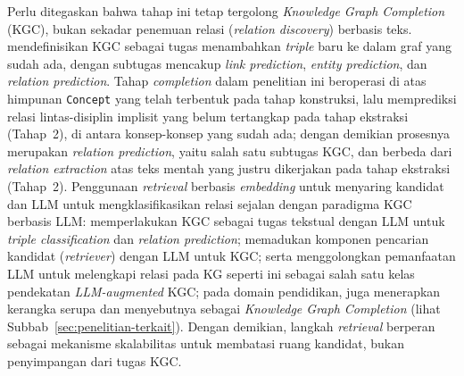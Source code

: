 \documentclass[../../thesis]{subfiles}
\begin{document}
Perlu ditegaskan bahwa tahap ini tetap tergolong \textit{Knowledge Graph
Completion} (KGC), bukan sekadar penemuan relasi (\textit{relation discovery})
berbasis teks. \textcite{ji_survey_2022} mendefinisikan KGC sebagai tugas
menambahkan \textit{triple} baru ke dalam graf yang sudah ada, dengan subtugas
mencakup \textit{link prediction}, \textit{entity prediction}, dan
\textit{relation prediction}. Tahap \textit{completion} dalam penelitian ini
beroperasi di atas himpunan \texttt{Concept} yang telah terbentuk pada tahap
konstruksi, lalu memprediksi relasi lintas-disiplin implisit yang belum tertangkap
pada tahap ekstraksi (Tahap~2), di antara konsep-konsep yang sudah ada; dengan
demikian prosesnya merupakan \textit{relation prediction}, yaitu
salah satu subtugas KGC, dan berbeda dari \textit{relation extraction} atas teks
mentah yang justru dikerjakan pada tahap ekstraksi (Tahap~2). Penggunaan
\textit{retrieval} berbasis \textit{embedding} untuk menyaring kandidat dan LLM
untuk mengklasifikasikan relasi sejalan dengan paradigma KGC berbasis LLM:
\textcite{yao_exploring_2025} memperlakukan KGC sebagai tugas tekstual dengan LLM
untuk \textit{triple classification} dan \textit{relation prediction};
\textcite{wei_kicgpt_2023} memadukan komponen pencarian kandidat (\textit{retriever})
dengan LLM untuk KGC;
serta \textcite{pan_unifying_2024} menggolongkan pemanfaatan LLM untuk melengkapi
relasi pada KG seperti ini sebagai salah satu kelas pendekatan
\textit{LLM-augmented} KGC; pada domain pendidikan, \textcite{abu-rasheed_llm-assisted_2025}
juga menerapkan kerangka serupa dan menyebutnya sebagai \textit{Knowledge Graph
Completion} (lihat Subbab~\ref{sec:penelitian-terkait}). Dengan demikian, langkah
\textit{retrieval} berperan sebagai mekanisme skalabilitas untuk membatasi ruang
kandidat, bukan penyimpangan dari tugas KGC.
\end{document}
